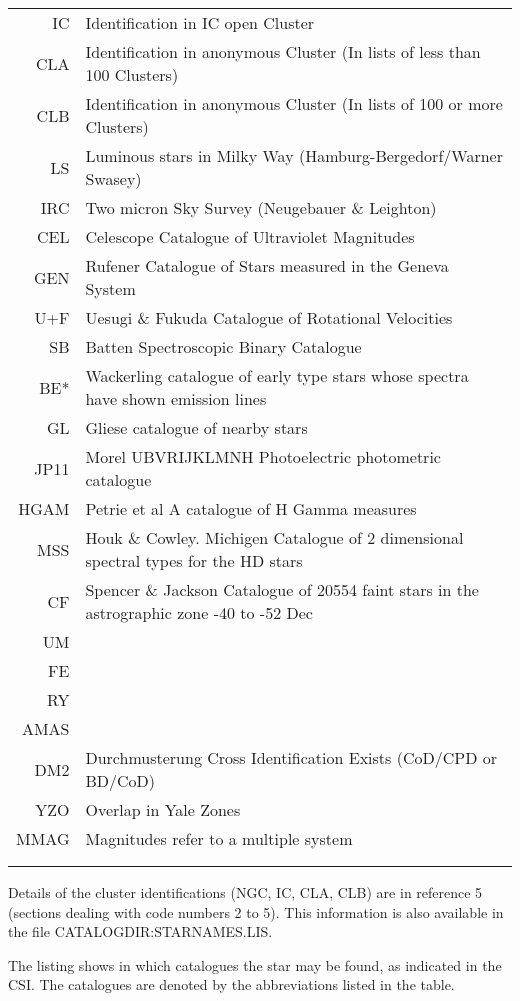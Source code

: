 \begin{tabular}{rl}
 IC   &  Identification in IC open Cluster\\
 CLA  &  Identification in anonymous Cluster
         (In lists of less than 100 Clusters)\\
 CLB  &  Identification in anonymous Cluster
         (In lists of 100 or more Clusters)\\
 LS   &  Luminous stars in Milky Way
         (Hamburg-Bergedorf/Warner Swasey)\\
 IRC  &  Two micron Sky Survey (Neugebauer \& Leighton)\\
 CEL  &  Celescope Catalogue of Ultraviolet Magnitudes\\
 GEN  &  Rufener Catalogue of Stars measured in the Geneva System\\
 U+F  &  Uesugi \& Fukuda Catalogue of Rotational Velocities\\
 SB   &  Batten Spectroscopic Binary Catalogue\\
 BE*  &  Wackerling catalogue of early type stars whose spectra
         have shown emission lines\\
  GL  &  Gliese catalogue of nearby stars\\
JP11  &  Morel UBVRIJKLMNH Photoelectric photometric catalogue\\
HGAM  &  Petrie et al A catalogue of H Gamma measures\\
 MSS  &  Houk \& Cowley. Michigen Catalogue of 2 dimensional
         spectral types for the HD stars\\
  CF  &  Spencer \& Jackson Catalogue of 20554 faint stars in the
         astrographic zone -40 to -52 Dec\\
  UM  & \\
  FE  & \\
  RY  & \\
AMAS  & \\
 DM2  &  Durchmusterung Cross Identification Exists
         (CoD/CPD or BD/CoD)\\
 YZO  &  Overlap in Yale Zones\\
MMAG  &  Magnitudes refer to a multiple system\\
& \\
& \\
\end{tabular}

Details of the cluster identifications (NGC, IC, CLA, CLB) are in reference 5
(sections dealing with code numbers 2 to 5).
This information is also available in the file CATALOGDIR:STARNAMES.LIS.

The listing shows in which catalogues the star may be found, as indicated in the
CSI.
The catalogues are denoted by the abbreviations listed in the table.

